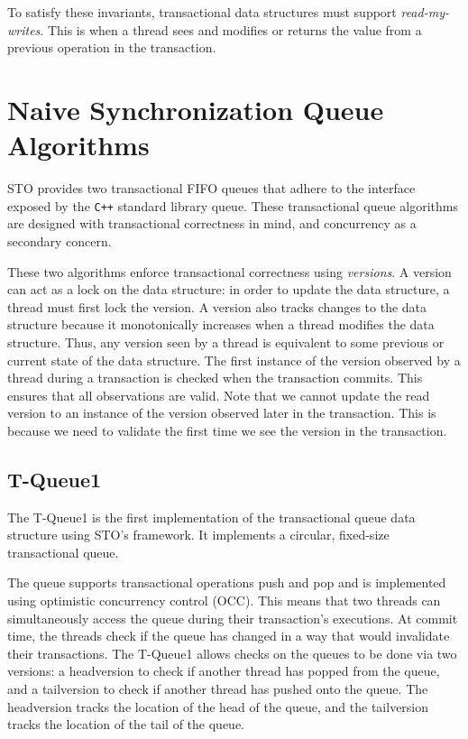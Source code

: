 \noindent
To satisfy these invariants, transactional data structures must support \emph{read-my-writes}. This is when a thread sees and modifies or returns the value from a previous operation in the transaction.


\section{Naive Synchronization Queue Algorithms}

STO provides two transactional FIFO queues that adhere to the interface exposed by the \texttt{C++} standard library queue. These transactional queue algorithms are designed with transactional correctness in mind, and concurrency as a secondary concern. 

These two algorithms enforce transactional correctness using \emph{versions}. A version can act as a lock on the data structure: in order to update the data structure, a thread must first lock the version. A version also tracks changes to the data structure because it monotonically increases when a thread modifies the data structure. Thus, any version seen by a thread is equivalent to some previous or current state of the data structure. The first instance of the version observed by a thread during a transaction is checked when the transaction commits. This ensures that all observations are valid. Note that we cannot update the read version to an instance of the version observed later in the transaction. This is because we need to validate the first time we see the version in the transaction. 

\subsection{T-Queue1}
The T-Queue1 is the first implementation of the transactional queue data structure using STO's framework. It implements a circular, fixed-size transactional queue.

The queue supports transactional operations push and pop and is implemented using optimistic concurrency control (OCC). This means that two threads can simultaneously access the queue during their transaction's executions. At commit time, the threads check if the queue has changed in a way that would invalidate their transactions. The T-Queue1 allows checks on the queues to be done via two versions: a headversion to check if another thread has popped from the queue, and a tailversion to check if another thread has pushed onto the queue. The headversion tracks the location of the head of the queue, and the tailversion tracks the location of the tail of the queue.

